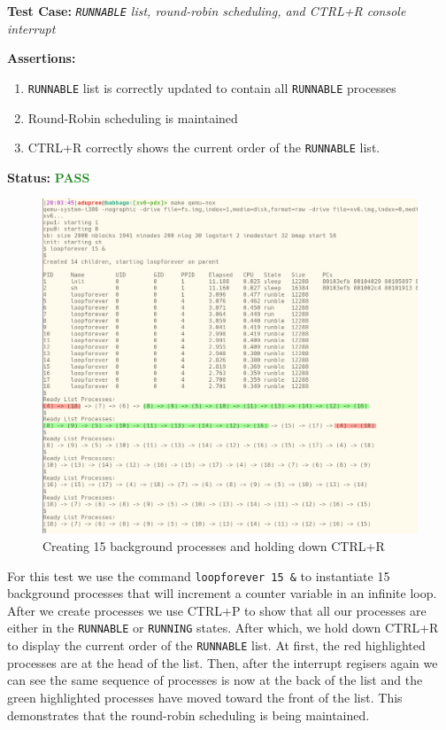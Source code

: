 \documentclass[11pt,letterpaper]{report}
\newcommand{\code}[1]{\colorbox{codegray}{\texttt{#1}}}
\begin{document}
{  \pagebreak

  \noindent\textbf{Test Case:} \emph{\code{RUNNABLE} list, round-robin scheduling, and CTRL+R console interrupt}
  
  \noindent\textbf{Assertions:}
  \begin{enumerate}[]
  \item \code{RUNNABLE} list is correctly updated to contain all \code{RUNNABLE} processes
  \item Round-Robin scheduling is maintained
  \item CTRL+R correctly shows the current order of the \code{RUNNABLE} list.
  \end{enumerate}  
  
  \noindent\textbf{Status:} \textcolor{ForestGreen}{\textbf{PASS}}
  
  \begin{figure}[h!]
	\centering
	\includegraphics[width=1\linewidth]{round-robin.png}
	\caption[img]{Creating 15 background processes and holding down CTRL+R}
	\label{fig:P1compileP0-1}
  \end{figure}

  For this test we use the command \code{loopforever 15 \&} to instantiate 15 background
  processes that will increment a counter variable in an infinite loop. After we create 
  processes we use CTRL+P to show that all our processes are either in the \code{RUNNABLE} 
  or \code{RUNNING} states. After which, we hold down CTRL+R to display the current order 
  of the \code{RUNNABLE} list. At first, the red highlighted processes are at the head of the 
  list. Then, after the interrupt regisers again we can see the same sequence of processes
  is now at the back of the list and the green highlighted processes have moved toward 
  the front of the list. This demonstrates that the round-robin scheduling is being 
  maintained.\\

}
\end{document}
